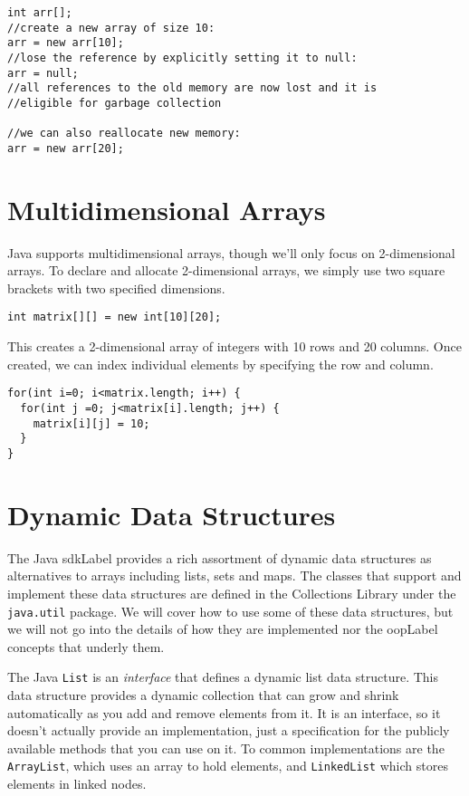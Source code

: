 \begin{verbatim}
int arr[];
//create a new array of size 10:
arr = new arr[10];
//lose the reference by explicitly setting it to null:
arr = null;
//all references to the old memory are now lost and it is 
//eligible for garbage collection

//we can also reallocate new memory: 
arr = new arr[20];
\end{verbatim}

\section{Multidimensional Arrays}

Java supports multidimensional arrays, though we'll only focus 
on 2-dimensional arrays.  To declare and allocate 2-dimensional
arrays, we simply use two square brackets with two specified
dimensions.

\begin{verbatim}
int matrix[][] = new int[10][20];
\end{verbatim}

This creates a 2-dimensional array of integers with 10 rows and
20 columns.  Once created, we can index individual elements by
specifying the row and column.

\begin{verbatim}
for(int i=0; i<matrix.length; i++) {
  for(int j =0; j<matrix[i].length; j++) {
    matrix[i][j] = 10;
  }
}
\end{verbatim}

\section{Dynamic Data Structures}

The Java \gls{sdkLabel} provides a rich assortment of dynamic
data structures as alternatives to arrays including lists, sets and
maps.  The classes that support and implement these data 
structures are defined in the Collections Library under the 
\texttt{java.util} package.  We will cover how to use
some of these data structures, but we will not go into the
details of how they are implemented nor the \gls{oopLabel}
concepts that underly them.

The Java \texttt{List} is an \emph{interface} that
defines a dynamic list data structure.  This data structure
provides a dynamic collection that can grow and shrink 
automatically as you add and remove elements from it.  It
is an interface, so it doesn't actually provide an implementation, 
just a specification for the publicly available methods that
you can use on it.  To common implementations are the 
\texttt{ArrayList}, which uses an array to hold 
elements, and \texttt{LinkedList} which stores
elements in linked nodes.

